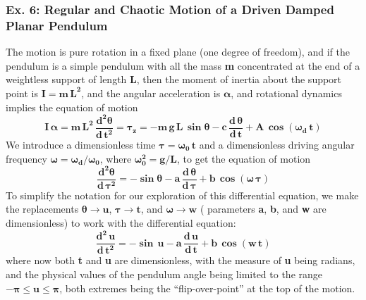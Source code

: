 \documentclass[11pt]{article}
\begin{document}
\subsubsection{Ex. 6: Regular and Chaotic Motion of a Driven Damped Planar Pendulum}
The motion is pure rotation in a fixed plane (one degree of freedom), and if the pendulum is a simple
  pendulum with all the mass \textbf{m} concentrated at the end of a weightless support of length
  \textbf{L}, then the moment of inertia about the support point is
  $\mathbf{I = m\,L^{2}}$, and the angular acceleration is $\mathbf{\boldsymbol{\alpha}}$,
  and rotational dynamics implies the equation of motion
\begin{equation}
\mathbf{I\,\boldsymbol{\alpha} = m\,L^{2}\,\frac{d^{2}\boldsymbol{\theta}}{d\,t^{2}} = 
    \boldsymbol{\tau}_{z} = - m\,g\,L\,\boldsymbol{\sin \theta} - 
	c\, \frac{d\,\boldsymbol{\theta}}{d\,t} + A\,\boldsymbol{\cos}(\boldsymbol{\omega}_{d}\,t)}
\end{equation}
  We introduce a dimensionless time $\mathbf{\boldsymbol{\tau} = \boldsymbol{\omega}_{0}\,t}$
  and a dimensionless driving angular frequency
  $\mathbf{ \boldsymbol{\omega}  =  \boldsymbol{\omega}_{d} / \boldsymbol{\omega}_{0} }$,
  where $\mathbf{\boldsymbol{\omega}_{0}^{2} = g/L}$, to get the
equation of motion
\begin{equation}
\mathbf{  \frac{d^{2}\boldsymbol{\theta}}{d\,\boldsymbol{\tau}^{2}} = 
         - \boldsymbol{\sin \theta} - a\, \frac{d\,\boldsymbol{\theta}}{d\,\boldsymbol{\tau}} + 
		 b \, \boldsymbol{\cos}(\boldsymbol{\omega}\,\boldsymbol{\tau})}
\end{equation}
To simplify the notation for our exploration of this differential equation,
  we make the replacements $\mathbf{\boldsymbol{\theta} \rightarrow u}$,
  $\mathbf{\boldsymbol{\tau} \rightarrow t}$, and
  $\mathbf{\boldsymbol{\omega} \rightarrow w}$ 
  ( parameters \textbf{a}, \textbf{b}, and \textbf{w}
   are dimensionless) to work with the differential equation:
\begin{equation}
\mathbf{\frac{d^{2}\,u}{d\,t^{2}} = - \boldsymbol{\sin}\,u  -
   a\,\frac{d\,u}{d\,t} + b\,\boldsymbol{\cos}(w\,t)}
\end{equation}
  where now both \textbf{t} and \textbf{u} are dimensionless, with the measure
  of \textbf{u} being radians, and the physical values of the pendulum angle being
  limited to the range $\mathbf{ -\boldsymbol{\pi} \leq u \leq \boldsymbol{\pi}}$,
  both extremes being the ``flip-over-point'' at the top of the motion.\\
  
\end{document}

